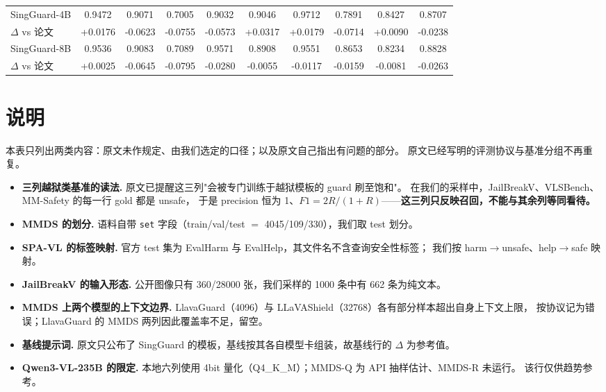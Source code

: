 \documentclass[10pt]{article}
\begin{document}
\begin{table}[t]
\begin{tabular}{lccccccccc}
SingGuard-4B & 0.9472 & 0.9071 & 0.7005 & 0.9032 & 0.9046 & 0.9712 & 0.7891 & 0.8427 & 0.8707 \\
\rowcolor{rowbg} \hspace{1.2em}$\Delta$ vs 论文 & \textcolor{posdelta}{+0.0176} & \textcolor{negdelta}{-0.0623} & \textcolor{negdelta}{-0.0755} & \textcolor{negdelta}{-0.0573} & \textcolor{posdelta}{+0.0317} & \textcolor{posdelta}{+0.0179} & \textcolor{negdelta}{-0.0714} & \textcolor{posdelta}{+0.0090} & \textcolor{negdelta}{-0.0238} \\
SingGuard-8B & 0.9536 & 0.9083 & 0.7089 & 0.9571 & 0.8908 & 0.9551 & 0.8653 & 0.8234 & 0.8828 \\
\rowcolor{rowbg} \hspace{1.2em}$\Delta$ vs 论文 & \textcolor{posdelta}{+0.0025} & \textcolor{negdelta}{-0.0645} & \textcolor{negdelta}{-0.0795} & \textcolor{negdelta}{-0.0280} & \textcolor{negdelta}{-0.0055} & \textcolor{negdelta}{-0.0117} & \textcolor{negdelta}{-0.0159} & \textcolor{negdelta}{-0.0081} & \textcolor{negdelta}{-0.0263} \\
\bottomrule\end{tabular}\end{table}


\section*{说明}
本表只列出两类内容：原文未作规定、由我们选定的口径；以及原文自己指出有问题的部分。
原文已经写明的评测协议与基准分组不再重复。

\begin{itemize}\itemsep4pt
  \item \textbf{三列越狱类基准的读法.}
        原文已提醒这三列"会被专门训练于越狱模板的 guard 刷至饱和"。
        在我们的采样中，JailBreakV、VLSBench、MM-Safety 的每一行 gold 都是 unsafe，
        于是 precision 恒为 1、$F1 = 2R/(1+R)$------\textbf{这三列只反映召回，不能与其余列等同看待。}
  \item \textbf{MMDS 的划分.}
        语料自带 \texttt{set} 字段（train/val/test $=$ 4045/109/330），我们取 test 划分。
  \item \textbf{SPA-VL 的标签映射.}
        官方 test 集为 EvalHarm 与 EvalHelp，其文件名不含查询安全性标签；
        我们按 harm$\rightarrow$unsafe、help$\rightarrow$safe 映射。
  \item \textbf{JailBreakV 的输入形态.}
        公开图像只有 360/28000 张，我们采样的 1000 条中有 662 条为纯文本。
  \item \textbf{MMDS 上两个模型的上下文边界.}
        LlavaGuard（4096）与 LLaVAShield（32768）各有部分样本超出自身上下文上限，
        按协议记为错误；LlavaGuard 的 MMDS 两列因此覆盖率不足，留空。
  \item \textbf{基线提示词.}
        原文只公布了 SingGuard 的模板，基线按其各自模型卡组装，故基线行的 $\Delta$ 为参考值。
  \item \textbf{Qwen3-VL-235B 的限定.}
        本地六列使用 4bit 量化（Q4\_K\_M）；MMDS-Q 为 API 抽样估计、MMDS-R 未运行。
        该行仅供趋势参考。
\end{itemize}
\end{document}
